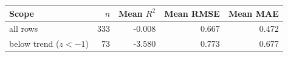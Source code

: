\begin{tabular}{@{}lrrrr@{}}
\toprule
Scope & $n$ & Mean $R^2$ & Mean RMSE & Mean MAE \\
\midrule
all rows & 333 & -0.008 & 0.667 & 0.472 \\
below trend ($z<-1$) & 73 & -3.580 & 0.773 & 0.677 \\
\bottomrule
\end{tabular}
